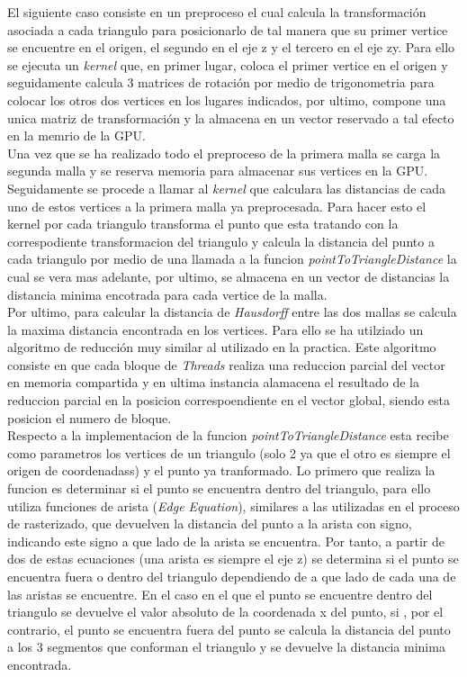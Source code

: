\documentclass[10pt,oneside,a4paper]{article}
\begin{document}
El siguiente caso consiste en un preproceso el cual calcula la transformación asociada a cada triangulo para posicionarlo de tal manera que su primer vertice se encuentre en el origen, el segundo en el eje z y el tercero en el eje zy. Para ello se ejecuta un \textit{kernel} que, en primer lugar, coloca el primer vertice en el origen y seguidamente calcula 3 matrices de rotación por medio de trigonometria para colocar los otros dos vertices en los lugares indicados, por ultimo, compone una unica matriz de transformación y la almacena en un vector reservado a tal efecto en la memrio de la GPU.\\

Una vez que se ha realizado todo el  preproceso de la primera malla se carga la segunda malla y se reserva memoria para almacenar sus vertices en la GPU. Seguidamente se procede a llamar al \textit{kernel} que calculara las distancias de cada uno de estos vertices a la primera malla ya preprocesada. Para hacer esto el kernel por cada triangulo transforma el punto que esta tratando con la correspodiente transformacion del triangulo y calcula la distancia del punto a cada triangulo por medio de una llamada a la funcion \textit{pointToTriangleDistance} la cual se vera mas adelante, por ultimo, se almacena en un vector de distancias la distancia minima encotrada para cada vertice de la malla.\\

Por ultimo, para calcular la distancia de \textit{Hausdorff} entre las dos mallas se calcula la maxima distancia encontrada en los vertices. Para ello se ha utilziado un algoritmo de reducción muy similar al utilizado en la practica. Este algoritmo consiste en que cada bloque de \textit{Threads} realiza una reduccion parcial del vector en memoria compartida y en ultima instancia alamacena el resultado de la reduccion parcial en la posicion correspoendiente en el vector global, siendo esta posicion el numero de bloque.\\

Respecto a la implementacion de la funcion \textit{pointToTriangleDistance} esta recibe como parametros los vertices de un triangulo (solo 2 ya que el otro es siempre el origen de coordenadass) y el punto ya tranformado. Lo primero que realiza la funcion es determinar si el punto se encuentra dentro del triangulo, para ello utiliza funciones de arista (\textit{Edge Equation}), similares a las utilizadas en el proceso de rasterizado, que devuelven la distancia del punto a la arista con signo, indicando este signo a que lado de la arista se encuentra. Por tanto, a partir de dos de estas ecuaciones (una arista es siempre el eje z) se determina si el punto se encuentra fuera o dentro del triangulo dependiendo de a que lado de cada una de las aristas se encuentre. En el caso en el que el punto se encuentre dentro del triangulo se devuelve el valor absoluto de la coordenada x del punto, si , por el contrario, el punto se encuentra fuera del punto se calcula la distancia del punto a los 3 segmentos que conforman el triangulo y se devuelve la distancia minima encontrada.
\end{document}

